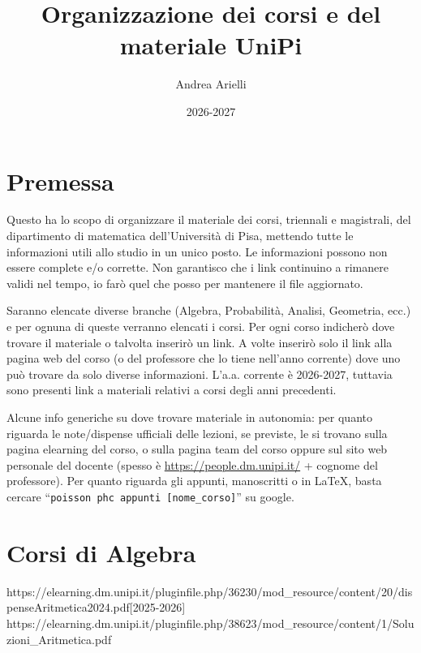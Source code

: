 \documentclass[a4paper,11pt]{article}
\title{Organizzazione dei corsi e del materiale UniPi}
\author{Andrea Arielli}
\date{2026-2027}
\begin{document}
\maketitle
\newpage
\tableofcontents
\newpage


\section{Premessa}
Questo ha lo scopo di organizzare il materiale dei corsi, triennali e magistrali, del dipartimento di matematica dell'Università di Pisa, mettendo tutte le informazioni utili allo studio in un unico posto.
Le informazioni possono non essere complete e/o corrette. Non garantisco che i link continuino a rimanere validi nel tempo, io farò quel che posso per mantenere il file aggiornato. 

Saranno elencate diverse branche (Algebra, Probabilità, Analisi, Geometria, ecc.) e per ognuna di queste verranno elencati i corsi. Per ogni corso indicherò dove trovare il materiale o talvolta inserirò un link. A volte inserirò solo il link alla pagina web del corso (o del professore che lo tiene nell'anno corrente) dove uno può trovare da solo diverse informazioni. L'a.a. corrente è 2026-2027, tuttavia sono presenti link a materiali relativi a corsi degli anni precedenti.

Alcune info generiche su dove trovare materiale in autonomia: per quanto riguarda le note/dispense ufficiali delle lezioni, se previste, le si trovano sulla pagina elearning del corso, o sulla pagina team del corso oppure sul sito web personale del docente (spesso è \url{https://people.dm.unipi.it/} + cognome del professore).
Per quanto riguarda gli appunti, manoscritti o in \LaTeX, basta cercare ``\texttt{poisson phc appunti [nome\_corso]}'' su google.


\newpage

\section{Corsi di Algebra}

 {https://elearning.dm.unipi.it/pluginfile.php/36230/mod_resource/content/20/dispenseAritmetica2024.pdf}[2025-2026] {https://elearning.dm.unipi.it/pluginfile.php/38623/mod_resource/content/1/Soluzioni_Aritmetica.pdf}

\begin{risorse}
\end{risorse}
\end{document}
